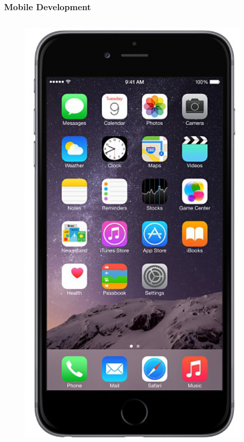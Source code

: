 \documentclass{beamer}
\begin{document}
\begin{frame}
	\frametitle{Mobile Development}
	\begin{columns}
		\begin{column}{0.3 \textwidth}
		\pause
		\begin{figure}
			\centering
				\includegraphics[width=1.00\textwidth]{img/iphone.jpg}
			\label{fig:iphone}
		\end{figure}
		

\end{column}
\end{columns}
\end{frame}
\end{document}
